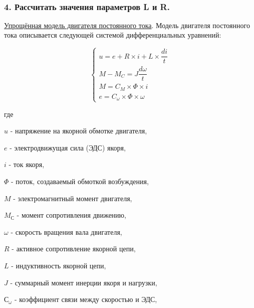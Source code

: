 \documentclass[12pt]{report}
\begin{document}
    \begin{center}
    \end{center}
    { \hspace*{\fill} \\}
    
    \hypertarget{ux440ux430ux441ux441ux447ux438ux442ux430ux442ux44c-ux437ux43dux430ux447ux435ux43dux438ux44f-ux43fux430ux440ux430ux43cux435ux442ux440ux43eux432-l-ux438-r.}{%
\subsubsection{4. Рассчитать значения параметров L и
R.}\label{ux440ux430ux441ux441ux447ux438ux442ux430ux442ux44c-ux437ux43dux430ux447ux435ux43dux438ux44f-ux43fux430ux440ux430ux43cux435ux442ux440ux43eux432-l-ux438-r.}}

    \href{https://life-prog.ru/2_22546_model-dvigatelya-postoyannogo-toka-s-nezavisimim-vozbuzhdeniem.html}{Упрощённая
модель двигателя постоянного тока}. Модель двигателя постоянного тока
описывается следующей системой дифференциальных уравнений:

\[
\begin{cases}
u = e + R \times i + L \times \dfrac{di}{t}
\\
M - M_C = J \dfrac{d\omega}{t}
\\
M = C_{M} \times \Phi \times i
\\
e = C_{\omega} \times \Phi \times \omega
\end{cases}
\]

где

\(u\) - напряжение на якорной обмотке двигателя,

\(e\) - электродвижущая сила (ЭДС) якоря,

\(i\) - ток якоря,

\(\Phi\) - поток, создаваемый обмоткой возбуждения,

\(M\) - электромагнитный момент двигателя,

\(M_С\) - момент сопротивления движению,

\(\omega\) - скорость вращения вала двигателя,

\(R\) - активное сопротивление якорной цепи,

\(L\) - индуктивность якорной цепи,

\(J\) - суммарный момент инерции якоря и нагрузки,

\(С_{\omega}\) - коэффициент связи между скоростью и ЭДС,
\end{document}
